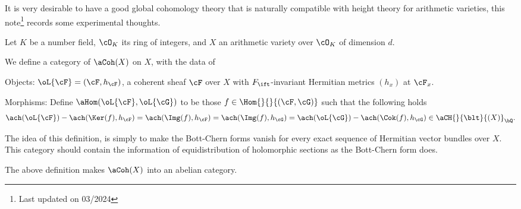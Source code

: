 \documentclass[a4paper, twoside]{article}
\begin{document}
\confighead{}{}{}

It is very desirable to have a good global cohomology theory that is naturally compatible with height theory for arithmetic varieties, this note\footnote{Last updated on 03/2024} records some experimental thoughts.

\begin{stp}
	Let $K$ be a number field, $\cO_{K}$ its ring of integers, and $X$ an arithmetic variety over $\cO_{K}$ of dimension $d$.
\end{stp}

\begin{dfn}
	We define a category of  $\aCoh(X)$ on $X$, with the data of
	\begin{itm}
		\item Objects: $\oL{\cF}=(\cF,h_{\cF})$, a coherent sheaf $\cF$ over $X$ with $F_{\ift}$-invariant Hermitian metrics $(h_{x})$ at $\cF_{x}$.
		\item Morphisms: Define $\aHom(\oL{\cF},\oL{\cG})$ to be those $f\in\Hom{}{}{(\cF,\cG)}$ such that the following holds
		\[
			\ach(\oL{\cF})-\ach(\Ker(f),h_{\cF})=\ach(\Img(f),h_{\cF})=\ach(\Img(f),h_{\cG})=\ach(\oL{\cG})-\ach(\Cok(f),h_{\cG})\in\aCH{}{\blt}{(X)}_{\bQ}.
		\]
	\end{itm}
\end{dfn}

\begin{rmk}
	The idea of this definition, is simply to make the Bott-Chern forms \cite{BC1965} vanish for every exact sequence of Hermitian vector bundles over $X$. This category should contain the information of equidistribution of holomorphic sections as the Bott-Chern form does.

\end{rmk}



\begin{thm}
	The above definition makes $\aCoh(X)$ into an abelian category.
\end{thm}
\end{document}
